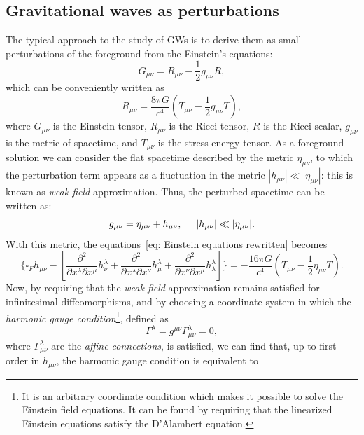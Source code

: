 \subsection{Gravitational waves as perturbations}
The typical approach to the study of GWs is to derive them as small perturbations of the foreground from the Einstein's equations: 
\begin{equation}
    G_{\mu\nu} = R_{\mu\nu} - \frac{1}{2}g_{\mu\nu}R,
\end{equation}
which can be conveniently written as 
\begin{equation}
    R_{\mu\nu}=\frac{8\pi G}{c^4}\left(T_{\mu\nu} - \frac{1}{2}g_{\mu\nu}T\right),
    \label{eq: Einstein equations rewritten}
\end{equation}
where $G_{\mu\nu}$ is the Einstein tensor, $R_{\mu\nu}$ is the Ricci tensor, $R$ is the Ricci scalar, $g_{\mu\nu}$ is the metric of spacetime, and $T_{\mu\nu}$ is the stress-energy tensor.
As a foreground solution we can consider the flat spacetime described by the metric $\eta_{\mu\nu}$, to which the perturbation term appears as a fluctuation in the metric $|h_{\mu\nu}|\ll|\eta_{\mu\nu}|$: this is known as \textit{weak field} approximation.
Thus, the perturbed spacetime can be written as:
\[
    g_{\mu\nu} = \eta_{\mu\nu} + h_{\mu\nu}, \hspace{5mm}  |h_{\mu\nu}|\ll|\eta_{\mu\nu}|.
\] 
With this metric, the equations~\ref{eq: Einstein equations rewritten} becomes
\[
    \{\square_F h_{\mu\nu} - \left[\frac{\partial^2}{\partial x^\lambda\partial x^\mu}h^\lambda_\nu + \frac{\partial^2}{\partial x^\lambda\partial x^\nu}h^\lambda_\mu + \frac{\partial^2}{\partial x^\nu\partial x^\mu}h^\lambda_\lambda\right]\} = -\frac{16\pi G}{c^4}\left(T_{\mu\nu} - \frac{1}{2}\eta_{\mu\nu}T\right).
\]
Now, by requiring that the \textit{weak-field} approximation remains satisfied for infinitesimal diffeomorphisms, and by choosing a coordinate system in which the \textit{harmonic gauge condition}\footnote{It is an arbitrary coordinate condition which makes it possible to solve the Einstein field equations. It can be found by requiring that the linearized Einstein equations satisfy the D'Alambert equation.}, defined as 
\begin{equation}
    \Gamma^\lambda = g^{\mu\nu}\Gamma^\lambda_{\mu\nu} = 0,
    \label{eq: Harmonic gauge definition}
\end{equation}
where $\Gamma^\lambda_{\mu\nu}$ are the \textit{affine connections}, is satisfied, we can find that, up to first order in $h_{\mu\nu}$, the harmonic gauge condition is equivalent to 
